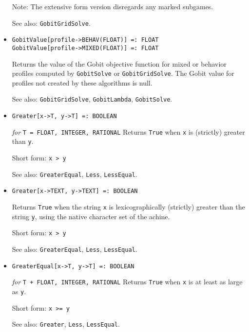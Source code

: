 \begin{itemize}
\item
[Note:] The extensive form version disregards any marked
subgames.
\item [See also:] \verb+GobitGridSolve+.
\ed

\item
\protect \large \begin{verbatim}
GobitValue[profile->BEHAV(FLOAT)] =: FLOAT
GobitValue[profile->MIXED(FLOAT)] =: FLOAT
\end{verbatim}\normalsize

\bd
Returns the value of the Gobit objective function for mixed or behavior
profiles computed by \verb+GobitSolve+ or \verb+GobitGridSolve+.  The Gobit
value for profiles not created by these algorithms is null.
\item
[See also:] \verb+GobitGridSolve+, \verb+GobitLambda+, \verb+GobitSolve+.
\ed

\item
\protect \large \begin{verbatim}
Greater[x->T, y->T] =: BOOLEAN
\end{verbatim}\normalsize

{\it for} {\tt T = FLOAT, INTEGER, RATIONAL}
\bd
Returns \verb+True+ when \verb+x+ is (strictly) greater than \verb+y+.
\item
[Short form:] \verb+x > y+
\item
[See also:] \verb+GreaterEqual+, \verb+Less+, \verb+LessEqual+.
\ed

\item
\protect \large \begin{verbatim}
Greater[x->TEXT, y->TEXT] =: BOOLEAN
\end{verbatim}\normalsize

\bd
Returns \verb+True+ when the string \verb+x+ is lexicographically (strictly)
greater than the string \verb+y+, using the native character set of the 
achine.
\item
[Short form:] \verb+x > y+
\item
[See also:] \verb+GreaterEqual+, \verb+Less+, \verb+LessEqual+.
\ed

\item
\protect \large \begin{verbatim}
GreaterEqual[x->T, y->T] =: BOOLEAN
\end{verbatim}\normalsize

{\it for} {\tt T + FLOAT, INTEGER, RATIONAL}
\bd
Returns \verb+True+ when \verb+x+ is at least as large as \verb+y+.
\item
[Short form:] \verb+x >= y+
\item
[See also:] \verb+Greater+, \verb+Less+, \verb+LessEqual+.
\ed


\end{itemize}
